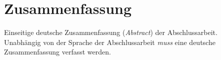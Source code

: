 
\chapter*{Zusammenfassung}

Einseitige deutsche Zusammenfassung (\emph{Abstract}) der Abschlussarbeit.
Unabhängig von der Sprache der Abschlussarbeit \emph{muss} eine deutsche Zusammenfassung verfasst werden.
